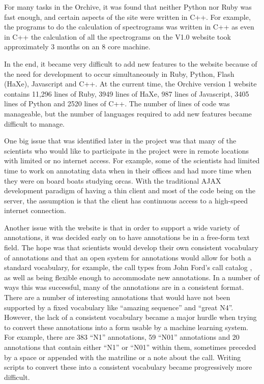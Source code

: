 \documentclass[12pt,oneside]{book}
\begin{document}
For many tasks in the Orchive, it was found that neither Python nor
Ruby was fast enough, and certain aspects of the site were written in
C++.  For example, the programs to do the calculation of spectrograms
was written in C++ as even in C++ the calculation of all the
spectrograms on the V1.0 website took approximately 3 months on an 8
core machine.

In the end, it became very difficult to add new features to the
website because of the need for development to occur simultaneously in
Ruby, Python, Flash (HaXe), Javascript and C++.  At the current time,
the Orchive version 1 website contains 11,296 lines of Ruby, 3949
lines of HaXe, 987 lines of Javascript, 3405 lines of Python and 2520
lines of C++.  The number of lines of code was manageable, but the
number of languages required to add new features became difficult to
manage.

One big issue that was identified later in the project was that many
of the scientists who would like to participate in the project were in
remote locations with limited or no internet access.  For example,
some of the scientists had limited time to work on annotating data
when in their offices and had more time when they were on board boats
studying orcas.  With the traditional AJAX development paradigm of
having a thin client and most of the code being on the server, the
assumption is that the client has continuous access to a high-speed
internet connection.

Another issue with the website is that in order to support a wide
variety of annotations, it was decided early on to have annotations be
in a free-form text field.  The hope was that scientists would develop
their own consistent vocabulary of annotations and that an open system
for annotations would allow for both a standard vocabulary, for
example, the call types from John Ford's call catalog
\cite{ford1987catalogue}, as well as being flexible enough to
accommodate new annotations.  In a number of ways this was successful,
many of the annotations are in a consistent format.  There are a
number of interesting annotations that would have not been supported
by a fixed vocabulary like ``amazing sequence'' and ``great N4''.
However, the lack of a consistent vocabulary became a major hurdle
when trying to convert these annotations into a form usable by a
machine learning system.  For example, there are 383 ``N1''
annotations, 59 ``N01'' annotations and 20 annotations that contain
either ``N1'' or ``N01'' within them, sometimes preceded by a space or
appended with the matriline or a note about the call.  Writing scripts
to convert these into a consistent vocabulary became progressively
more difficult.
\end{document}
